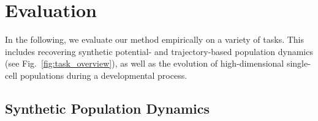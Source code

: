 \begin{table}[t]
    \caption{Evaluation of predictive performance w.r.t. the entropy-regularized Wasserstein distance $W_\varepsilon$ \eqref{eq:reg-ot} of \textsc{JKOnet} and the forward method on the embryoid body scRNA-seq data per time step (using 3 runs).}
    \label{tab:exp_jkonet_cell_pred}
    \centering
{}
\end{table}

\section{Evaluation} \label{sec:evaluation}
In the following, we evaluate our method empirically on a variety of tasks. This includes recovering synthetic potential- and trajectory-based population dynamics (see Fig.~\ref{fig:task_overview}), as well as the evolution of high-dimensional single-cell populations during a developmental process. 

\subsection{Synthetic Population Dynamics} \label{sec:eval_synt}
